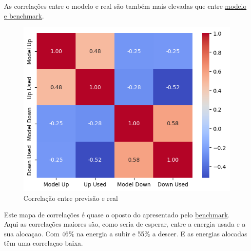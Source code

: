 As correlações entre o modelo e real são também mais elevadas que entre \hyperref[fig:featurecorrelation]{modelo e benchmark}.


\begin{figure}[H]
    \centering
    \includegraphics[width=\textwidth]{plots/heatmap_correlation_pred.png}
    \caption{Correlação entre previsão e real}
    \label{fig:predcorrelation}
  \end{figure}

Este mapa de correlações é quase o oposto do apresentado pelo \hyperref[fig:benchmarkcorr]{benchmark}.\\
Aqui as correlações maiores são, como seria de esperar, entre a energia usada e a sua alocaçao. Com 46\% na energia a subir e 55\% a descer. E as energias alocadas têm uma correlaçao baixa.\\ 